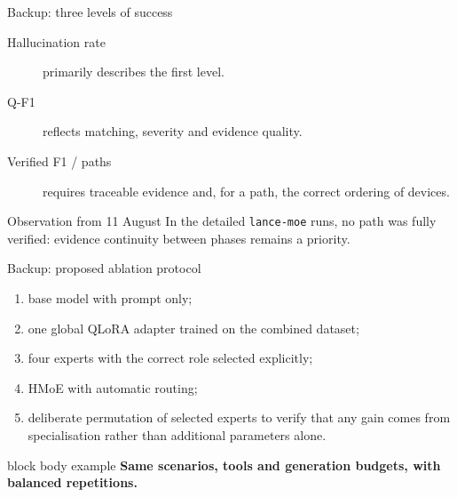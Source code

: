 \documentclass[aspectratio=169,10pt]{beamer}
\newcommand{\keymessage}[1]{%
  \begin{beamercolorbox}[rounded=true,sep=1.1ex,wd=\linewidth]{block body example}
    \centering\bfseries #1
  \end{beamercolorbox}
}
\begin{document}
\begin{frame}{Backup: three levels of success}
  \centering

  \vspace{1.2em}
  \begin{description}
    \item[Hallucination rate] primarily describes the first level.
    \item[Q-F1] reflects matching, severity and evidence quality.
    \item[Verified F1 / paths] requires traceable evidence and, for a path, the
      correct ordering of devices.
  \end{description}

  \begin{alertblock}{Observation from 11 August}
    In the detailed \texttt{lance-moe} runs, no path was fully verified:
    evidence continuity between phases remains a priority.
  \end{alertblock}
\end{frame}

\begin{frame}{Backup: proposed ablation protocol}
  \begin{enumerate}
    \item base model with prompt only;
    \item one global QLoRA adapter trained on the combined dataset;
    \item four experts with the correct role selected explicitly;
    \item HMoE with automatic routing;
    \item deliberate permutation of selected experts to verify that any gain
      comes from specialisation rather than additional parameters alone.
  \end{enumerate}

  \vspace{0.8em}
  \keymessage{Same scenarios, tools and generation budgets, with balanced repetitions.}
\end{frame}
\end{document}
